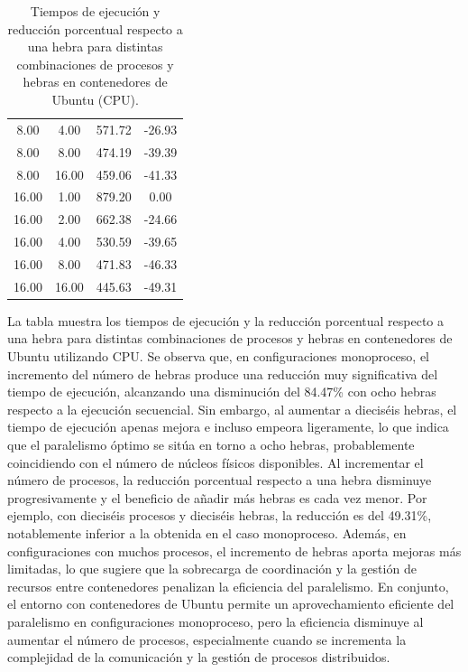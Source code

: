 \begin{table}[ht]
\begin{tabular}{|c|c|c|c|}
        8.00              & 4.00            & 571.72              & -26.93                         \\
        8.00              & 8.00            & 474.19              & -39.39                         \\
        8.00              & 16.00           & 459.06              & -41.33                         \\
        16.00             & 1.00            & 879.20              & 0.00                           \\
        16.00             & 2.00            & 662.38              & -24.66                         \\
        16.00             & 4.00            & 530.59              & -39.65                         \\
        16.00             & 8.00            & 471.83              & -46.33                         \\
        16.00             & 16.00           & 445.63              & -49.31                         \\
        \hline
    \end{tabular}
    \caption{Tiempos de ejecución y reducción porcentual respecto a una hebra para distintas combinaciones de procesos y hebras en contenedores de Ubuntu (CPU).}
    \label{tab:thread_sweep_ubuntu_docker_time}
\end{table}

La tabla muestra los tiempos de ejecución y la reducción porcentual respecto a una hebra para distintas combinaciones de procesos y hebras en contenedores de Ubuntu utilizando CPU. Se observa que, en configuraciones monoproceso, el incremento del número de hebras produce una reducción muy significativa del tiempo de ejecución, alcanzando una disminución del 84.47\% con ocho hebras respecto a la ejecución secuencial. Sin embargo, al aumentar a dieciséis hebras, el tiempo de ejecución apenas mejora e incluso empeora ligeramente, lo que indica que el paralelismo óptimo se sitúa en torno a ocho hebras, probablemente coincidiendo con el número de núcleos físicos disponibles. Al incrementar el número de procesos, la reducción porcentual respecto a una hebra disminuye progresivamente y el beneficio de añadir más hebras es cada vez menor. Por ejemplo, con dieciséis procesos y dieciséis hebras, la reducción es del 49.31\%, notablemente inferior a la obtenida en el caso monoproceso. Además, en configuraciones con muchos procesos, el incremento de hebras aporta mejoras más limitadas, lo que sugiere que la sobrecarga de coordinación y la gestión de recursos entre contenedores penalizan la eficiencia del paralelismo. En conjunto, el entorno con contenedores de Ubuntu permite un aprovechamiento eficiente del paralelismo en configuraciones monoproceso, pero la eficiencia disminuye al aumentar el número de procesos, especialmente cuando se incrementa la complejidad de la comunicación y la gestión de procesos distribuidos.

